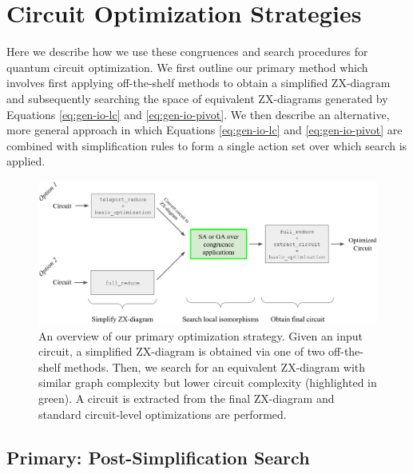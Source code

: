 \section{Circuit Optimization Strategies}

Here we describe how we use these congruences and search procedures for quantum circuit optimization.
We first outline our primary method which involves first applying off-the-shelf methods to obtain a simplified ZX-diagram and subsequently searching the space of equivalent ZX-diagrams generated by Equations \ref{eq:gen-io-lc} and \ref{eq:gen-io-pivot}.
We then describe an alternative, more general approach in which Equations \ref{eq:gen-io-lc} and \ref{eq:gen-io-pivot} are combined with simplification rules to form a single action set over which search is applied.


\begin{figure}[t]
\centering
\includegraphics[width=15cm]{img/primary-overview.png}
\caption{
  An overview of our primary optimization strategy.
  Given an input circuit, a simplified ZX-diagram is obtained via one of two off-the-shelf methods.
  Then, we search for an equivalent ZX-diagram with similar graph complexity but lower circuit complexity (highlighted in green).
  A circuit is extracted from the final ZX-diagram and standard circuit-level optimizations are performed.
}
\label{fig:primary}
\end{figure}

\subsection{Primary: Post-Simplification Search}\label{sec:primary}

